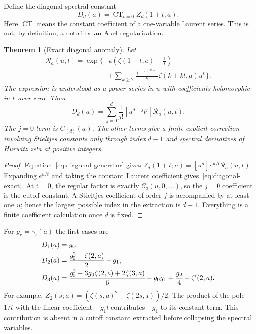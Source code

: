 \documentclass[11pt,oneside]{article}
\numberwithin{equation}{section}
\newtheorem{theorem}{Theorem}[section]
\theoremstyle{definition}
\theoremstyle{remark}
\DeclareMathOperator{\CT}{CT}
\newcommand{\CC}{\mathcal C}
\newcommand{\RR}{\mathcal R}
\begin{document}
Define the diagonal spectral constant
\begin{equation}\label{eq:Dd}
D_d(a)=\CT_{t=0}Z_d(1+t;a).
\end{equation}
Here $\CT$ means the constant coefficient of a one-variable Laurent series.
This is not, by definition, a cutoff or an Abel regularization.

\begin{theorem}[Exact diagonal anomaly]\label{thm:diagonal}
Let
\begin{equation}\label{eq:Rdiag}
\begin{split}
\RR_a(u,t)=\exp\biggl\{&u\left(\zeta(1+t,a)-\frac1t\right)\\
 &+\sum_{k\ge2}\frac{(-1)^{k-1}}k\zeta(k+kt,a)u^k\biggr\}.
\end{split}
\end{equation}
The expression is understood as a power series in $u$ with coefficients
holomorphic in $t$ near zero. Then
\begin{equation}\label{eq:diagonal-exact}
\boxed{\displaystyle
D_d(a)=\sum_{j=0}^d\frac1{j!}
               [u^{d-j}t^j]\RR_a(u,t).}
\end{equation}
The $j=0$ term is $C_{(d)}(a)$. The other terms give a finite explicit
correction involving Stieltjes constants only through index $d-1$ and
spectral derivatives of Hurwitz zeta at positive integers.
\end{theorem}

\begin{proof}
Equation~\eqref{eq:diagonal-generator} gives
$Z_d(1+t;a)=[u^d]e^{u/t}\RR_a(u,t)$. Expanding $e^{u/t}$ and taking the
constant Laurent coefficient gives~\eqref{eq:diagonal-exact}. At $t=0$, the
regular factor is exactly $\CC_a(u,0,\ldots)$, so the $j=0$ coefficient is the
cutoff constant. A Stieltjes coefficient of order $j$ is accompanied by at
least one $u$; hence the largest possible index in the extraction is $d-1$.
Everything is a finite coefficient calculation once $d$ is fixed.
\end{proof}

For $g_r=\gamma_r(a)$ the first cases are
\begin{align}
D_1(a)&=g_0,\notag\\
D_2(a)&=\frac{g_0^2-\zeta(2,a)}2-g_1,\label{eq:diag2}\\
D_3(a)&=\frac{g_0^3-3g_0\zeta(2,a)+2\zeta(3,a)}6
       -g_0g_1+\frac{g_2}{4}-\zeta'(2,a).
\label{eq:diag3}
\end{align}
For example, $Z_2(s;a)=(\zeta(s,a)^2-\zeta(2s,a))/2$. The product of the
pole $1/t$ with the linear coefficient $-g_1t$ contributes $-g_1$ to its
constant term. This contribution is absent in a cutoff constant extracted
before collapsing the spectral variables.
\end{document}
